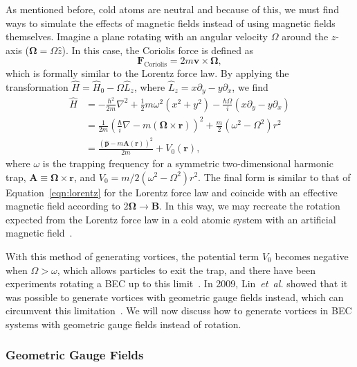 As mentioned before, cold atoms are neutral and because of this, we must find ways to simulate the effects of magnetic fields instead of using magnetic fields themselves.
Imagine a plane rotating with an angular velocity $\Omega$ around the $z$-axis ($\mathbf{\Omega} = \Omega \hat z$). 
In this case, the Coriolis force is defined as
\begin{equation}
\mathbf{F}_{\text{Coriolis}} = 2m \mathbf{v} \times \mathbf{\Omega},
\end{equation}
which is formally similar to the Lorentz force law.
By applying the transformation $\hat H = \hat H_0 - \Omega \hat L_z$, where $\hat L_z = x\partial_y - y\partial_x$, we find~\cite{Bhat2008}
\begin{equation}
\begin{split}
\hat H &= -\frac{\hbar^2}{2m}\nabla^2 + \frac 1 2 m \omega^2(x^2 + y^2) - \frac{\hbar \Omega}{i}(x\partial_y - y\partial_x) \\
 &= \frac{1}{2m}\left(\frac{\hbar}{i}\nabla - m(\mathbf{\Omega} \times \mathbf{r})\right)^2 + \frac m 2 \left( \omega^2 - \Omega^2 \right)r^2 \\
 &= \frac{(\hat{\mathbf{p}}-m\mathbf{A}(\mathbf{r}))^2}{2m}+ V_0(\mathbf{r}),
\end{split}
\end{equation}
where $\omega$ is the trapping frequency for a symmetric two-dimensional harmonic trap, $\mathbf{A} \equiv \mathbf{\Omega} \times \mathbf{r}$, and $V_0 = m/2 \left( \omega^2 - \Omega^2 \right)r^2$.
The final form is similar to that of Equation~\eqref{eqn:lorentz} for the Lorentz force law and coincide with an effective magnetic field according to $2 \mathbf \Omega \rightarrow \mathbf B$.
In this way, we may recreate the rotation expected from the Lorentz force law in a cold atomic system with an artificial magnetic field~\cite{Peshkin1989, Madison2000, Abo-Shaeer2001}.

With this method of generating vortices, the potential term $V_0$ becomes negative when $\Omega > \omega$, which allows particles to exit the trap, and there have been experiments rotating a BEC up to this limit~\cite{Schweikhard2004}.
In 2009, Lin~\textit{et~al.} showed that it was possible to generate vortices with geometric gauge fields instead, which can circumvent this limitation~\cite{Lin2009}.
We will now discuss how to generate vortices in BEC systems with geometric gauge fields instead of rotation.

\subsubsection{Geometric Gauge Fields}
\label{sec:geom}

